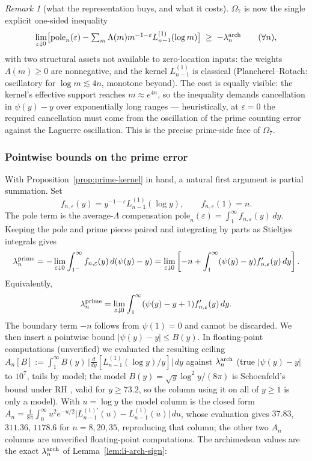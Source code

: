 \documentclass[11pt]{amsart}
\theoremstyle{definition}
\theoremstyle{remark}
\newtheorem{remark}[theorem]{Remark}
\theoremstyle{definition}
\begin{document}
\begin{remark}[what the representation buys, and what it costs]\label{rmk:prime-kernel-shape}
$\Omega_7$ is now the single explicit one-sided inequality
\[
   \lim_{\varepsilon\downarrow0}\bigl[\text{pole}_n(\varepsilon)-
   \textstyle\sum_m\Lambda(m)m^{-1-\varepsilon}L^{(1)}_{n-1}(\log m)\bigr]
   \;\ge\;-\lambda_n^{\rm arch}\qquad(\forall n),
\]
with two structural assets not available to zero-location inputs: the weights $\Lambda(m)\ge0$ are
nonnegative, and the kernel $L^{(1)}_{n-1}$ is classical (Plancherel--Rotach: oscillatory for
$\log m\lesssim4n$, monotone beyond).  The cost is equally visible: the kernel's effective support
reaches $m\approx e^{4n}$, so the inequality demands cancellation in $\psi(y)-y$ over exponentially
long ranges --- heuristically, at $\varepsilon=0$ the required cancellation must come from the oscillation of the prime counting error against the Laguerre
oscillation.  This is the precise prime-side face of $\Omega_7$.
\end{remark}

\subsubsection*{Pointwise bounds on the prime error}

With Proposition~\ref{prop:prime-kernel} in hand, a natural first argument is partial summation.  Set
\[
   f_{n,\varepsilon}(y)=y^{-1-\varepsilon}L^{(1)}_{n-1}(\log y),
   \qquad f_{n,\varepsilon}(1)=n.
\]
The pole term is the average-$\Lambda$ compensation
$\mathrm{pole}_n(\varepsilon)=\int_1^\infty f_{n,\varepsilon}(y)\,dy$.  Keeping the pole and prime
pieces paired and integrating by parts as Stieltjes integrals gives
\[
   \lambda_n^{\rm prime}
   =-\lim_{\varepsilon\downarrow0}\int_{1^-}^\infty
       f_{n,\varepsilon}(y)\,d(\psi(y)-y)
   =\lim_{\varepsilon\downarrow0}\left[
       -n+\int_1^\infty(\psi(y)-y)f'_{n,\varepsilon}(y)\,dy
     \right].
\]
Equivalently,
\[
   \lambda_n^{\rm prime}
   =\lim_{\varepsilon\downarrow0}\int_1^\infty
      (\psi(y)-y+1)f'_{n,\varepsilon}(y)\,dy .
\]
The boundary term $-n$ follows from $\psi(1)=0$ and cannot be discarded.  We then insert a pointwise
bound $|\psi(y)-y|\le B(y)$.  In floating-point computations (unverified) we evaluated the resulting ceiling
$A_n[B]:=\int_1^\infty B(y)\,\bigl|\tfrac{d}{dy}[L^{(1)}_{n-1}(\log y)/y]\bigr|\,dy$ against
$\lambda_n^{\rm arch}$ (true $|\psi(y)-y|$ to $10^7$, tails by model; the model
$B(y)=\sqrt y\log^2y/(8\pi)$ is Schoenfeld's bound under RH \cite{Schoenfeld1976}, valid for
$y\ge73.2$, so the column using it on all of $y\ge1$ is only a model).  With $u=\log y$ the
model column is the closed form
$A_n=\frac1{8\pi}\int_0^\infty u^2e^{-u/2}\bigl|L^{(1)\prime}_{n-1}(u)-L^{(1)}_{n-1}(u)\bigr|\,du$,
whose evaluation gives $37.83$, $311.36$, $1178.6$ for $n=8,20,35$, reproducing that column; the
other two $A_n$ columns are unverified floating-point computations.  The archimedean values are the
exact $\lambda_n^{\rm arch}$ of Lemma~\ref{lem:li-arch-sign}:
\end{document}
